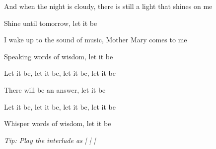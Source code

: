 \begin{song}
\bigskip

    

\bigskip

And when the night is cloudy, there is still a light that shines on me \par
{}Shine until tomorrow, let it be    \par
I wake up to the sound of music, Mother Mary comes to me \par
{}Speaking words of wisdom, let it be    \par

\bigskip

Let it be, let it be, let it be, let it be \par
{}There will be an answer, let it be    \par
Let it be, let it be, let it be, let it be \par
{}Whisper words of wisdom, let it be    \par

\bigskip

    

\vfill

{
\smaller\it
Tip: Play the interlude as    |    |   | 
}

\bigskip

{
\small
{}
}

\vspace{2em}

\end{song}
